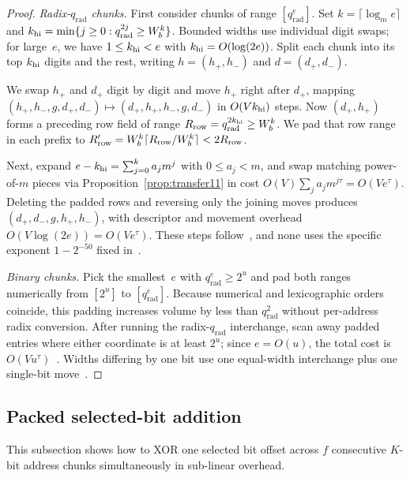 \begin{proof}
\emph{Radix-$q_{\mathrm{rad}}$ chunks.}
First consider chunks of range $[q_{\mathrm{rad}}^e]$. Set $k=\lceil\log_me\rceil$ and $k_{\rm hi}=\min\{j\ge0:q_{\mathrm{rad}}^{2j}\ge W_b^k\}$. Bounded widths use individual digit swaps; for large~$e$, we have $1\le k_{\rm hi}<e$ with $k_{\rm hi}=O(\log(2e))$. Split each chunk into its top $k_{\rm hi}$ digits and the rest, writing $h=(h_+,h_-)$ and $d=(d_+,d_-)$.

We swap $h_+$ and $d_+$ digit by digit and move $h_+$ right after $d_+$, mapping $(h_+,h_-,g,d_+,d_-)\mapsto(d_+,h_+,h_-,g,d_-)$ in $O(Vk_{\rm hi})$ steps. Now $(d_+,h_+)$ forms a preceding row field of range $R_{\rm row}=q_{\mathrm{rad}}^{2k_{\rm hi}}\ge W_b^k$. We pad that row range in each prefix to $R'_{\rm row}=W_b^k\lceil R_{\rm row}/W_b^k\rceil<2R_{\rm row}$.

Next, expand $e-k_{\rm hi}=\sum_{j=0}^ka_jm^j$ with $0\le a_j<m$, and swap matching power-of-$m$ pieces via Proposition~\ref{prop:transfer11} in cost $O(V)\sum_ja_jm^{j\tau}=O(Ve^\tau)$. Deleting the padded rows and reversing only the joining moves produces $(d_+,d_-,g,h_+,h_-)$, with descriptor and movement overhead $O(V\log(2e))=O(Ve^\tau)$. These steps follow~\cite[proof of Lemma~12, \S4.3]{OAI26}, and none uses the specific exponent $1-2^{-50}$ fixed in~\cite[\S4.2, p.~24]{OAI26}.

\emph{Binary chunks.}
Pick the smallest~$e$ with $q_{\mathrm{rad}}^e\ge2^u$ and pad both ranges numerically from $[2^u]$ to $[q_{\mathrm{rad}}^e]$. Because numerical and lexicographic orders coincide, this padding increases volume by less than $q_{\mathrm{rad}}^2$ without per-address radix conversion. After running the radix-$q_{\mathrm{rad}}$ interchange, scan away padded entries where either coordinate is at least $2^u$; since $e=O(u)$, the total cost is $O(Vu^\tau)$~\cite[proof of Lemma~12, p.~25]{OAI26}. Widths differing by one bit use one equal-width interchange plus one single-bit move~\cite[\S4.3, p.~25]{OAI26}.
\end{proof}

\subsection{Packed selected-bit addition}\label{sec:transfer-packed}

This subsection shows how to XOR one selected bit offset across $f$ consecutive $K$-bit address chunks simultaneously in sub-linear overhead.

